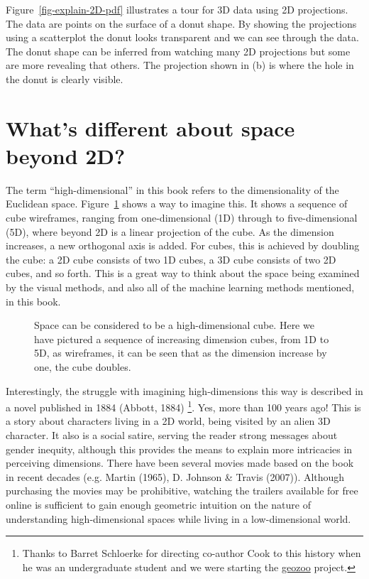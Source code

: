 \documentclass[
  letterpaper,
]{krantz}
\begin{document}
Figure~\ref{fig-explain-2D-pdf} illustrates a tour for 3D data using 2D
projections. The data are points on the surface of a donut shape. By
showing the projections using a scatterplot the donut looks transparent
and we can see through the data. The donut shape can be inferred from
watching many 2D projections but some are more revealing that others.
The projection shown in (b) is where the hole in the donut is clearly
visible. 

\section{What's different about space beyond
2D?}\label{whats-different-about-space-beyond-2d}

The term ``high-dimensional'' in this book refers to the dimensionality
of the Euclidean space. Figure~\ref{fig-dimension-cubes} shows a way to
imagine this. It shows a sequence of cube wireframes, ranging from
one-dimensional (1D) through to five-dimensional (5D), where beyond 2D
is a linear projection of the cube. As the dimension increases, a new
orthogonal axis is added. For cubes, this is achieved by doubling the
cube: a 2D cube consists of two 1D cubes, a 3D cube consists of two 2D
cubes, and so forth. This is a great way to think about the space being
examined by the visual methods, and also all of the machine learning
methods mentioned, in this book.


\begin{figure}


\caption{\label{fig-dimension-cubes}Space can be considered to be a
high-dimensional cube. Here we have pictured a sequence of increasing
dimension cubes, from 1D to 5D, as wireframes, it can be seen that as
the dimension increase by one, the cube doubles.}

\end{figure}%

Interestingly, the struggle with imagining high-dimensions this way is
described in a novel published in 1884 (Abbott, 1884) \footnote{Thanks
  to Barret Schloerke for directing co-author Cook to this history when
  he was an undergraduate student and we were starting the
  \href{http://schloerke.com/geozoo/}{geozoo} project.}. Yes, more than
100 years ago! This is a story about characters living in a 2D world,
being visited by an alien 3D character. It also is a social satire,
serving the reader strong messages about gender inequity, although this
provides the means to explain more intricacies in perceiving dimensions.
There have been several movies made based on the book in recent decades
(e.g. Martin (1965), D. Johnson \& Travis (2007)). Although purchasing
the movies may be prohibitive, watching the trailers available for free
online is sufficient to gain enough geometric intuition on the nature of
understanding high-dimensional spaces while living in a low-dimensional
world.
\end{document}
